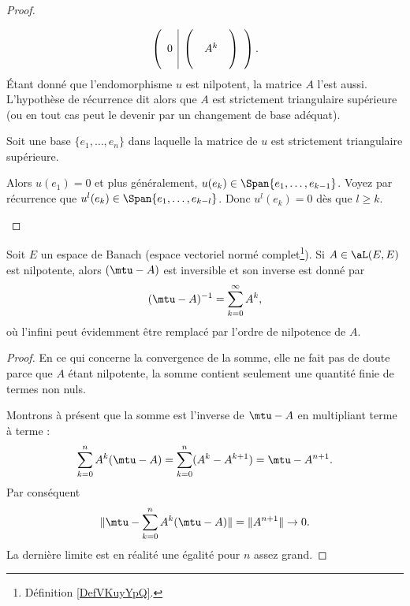 \begin{proof}
\begin{subproof}
\begin{equation}
\begin{pmatrix}
\begin{array}[]{c|c}
\begin{matrix}
						0
					\end{matrix} &
					\begin{pmatrix}
						 &     & \\
						 & A^k & \\
						 &     &
					\end{pmatrix}
				\end{array}
			\end{pmatrix}.
		\end{equation}
		Étant donné que l'endomorphisme \( u\) est nilpotent, la matrice \( A\) l'est aussi. L'hypothèse de récurrence dit alors que \( A\) est strictement triangulaire supérieure (ou en tout cas peut le devenir par un changement de base adéquat).

		\spitem[\( \Leftarrow\)]
		Soit une base \( \{ e_1,\ldots, e_n \}  \) dans laquelle la matrice de \( u\) est strictement triangulaire supérieure.

		Alors \( u(e_1)=0\) et plus généralement, \( u(e_k)\in \Span\{ e_1,\ldots, e_{k-1} \}\). Voyez par récurrence que \( u^l(e_k)\in \Span\{ e_1,\ldots, e_{k-l} \}\). Donc \( u^l(e_k)=0\) dès que \( l\geq k\).
	\end{subproof}
\end{proof}

\begin{proposition}     \label{PROPooWTFWooXHlmhp}
	Soit \( E\) un espace de Banach (espace vectoriel normé complet\footnote{Définition \ref{DefVKuyYpQ}.}). Si \( A\in\aL(E,E)\) est nilpotente, alors \( (\mtu-A)\) est inversible et son inverse est donné par
	\begin{equation}
		(\mtu-A)^{-1}=\sum_{k=0}^{\infty}A^k,
	\end{equation}
	où l'infini peut évidemment être remplacé par l'ordre de nilpotence de \( A\).
\end{proposition}

\begin{proof}
	En ce qui concerne la convergence de la somme, elle ne fait pas de doute parce que \( A\) étant nilpotente, la somme contient seulement une quantité finie de termes non nuls.

	Montrons à présent que la somme est l'inverse de \( \mtu-A\) en multipliant terme à terme :
	\begin{equation}
		\sum_{k=0}^nA^k(\mtu-A)=\sum_{k=0}^n(A^k-A^{k+1})=\mtu-A^{n+1}.
	\end{equation}
	Par conséquent
	\begin{equation}
		\| \mtu-\sum_{k=0}^nA^k(\mtu-A) \|=\| A^{n+1} \|\to 0.
	\end{equation}
	La dernière limite est en réalité une égalité pour \( n\) assez grand.
\end{proof}


